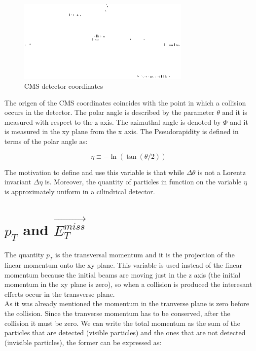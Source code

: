  \begin{figure}[h] \label{CMSCoordinates}
 \centering
 \caption{CMS detector coordinates}
 \includegraphics[width=0.75\textwidth]{./Capitulos/VariableDefinitions/CMS_coordinates}  
 \end{figure}

The origen of the CMS coordinates coincides with the point in which a collision occurs in the detector. 
The polar angle is described by the parameter $\theta$ and it is measured with respect to the z axis.
The azimuthal angle is denoted by $\Phi$ and it is measured in the xy plane from the x axis. The Pseudorapidity is defined in terms of the polar angle as:

\begin{equation}
 \eta \equiv - \ln \left( \tan (\theta /2 ) \right)
\end{equation}

 The motivation to define and use this variable is that while $\Delta \theta$ is not a Lorentz invariant $\Delta \eta$ is. Moreover, the quantity of particles in function on the variable $\eta$
 is approximately uniform in a cilindrical detector. 
 
  
 \section{$p_T$ and $\vec{E_T^{miss}}$}

 The quantity $p_T$ is the transversal momentum and it is the projection of the linear momentum onto the xy plane. This variable is used instead of the linear momentum because the initial beams
 are moving just in the z axis (the initial momentum in the xy plane is zero), so when a collision is produced the interesant effects occur in the transverse plane.\\
 
 As it was already mentioned the momentum in the tranverse plane is zero before the collision. Since the tranverse momentum has to be conserved, after the collision it must be zero. We can write
 the total momentum as the sum of the particles that are detected (visible particles) and the ones that are not detected (invisible particles), the former can be expressed as:
 
